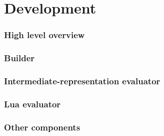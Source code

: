 \chapter{Development}


\subsection{High level overview}

\subsection{Builder}

\subsection{Intermediate-representation evaluator}

\subsection{Lua evaluator}

\subsection{Other components}
